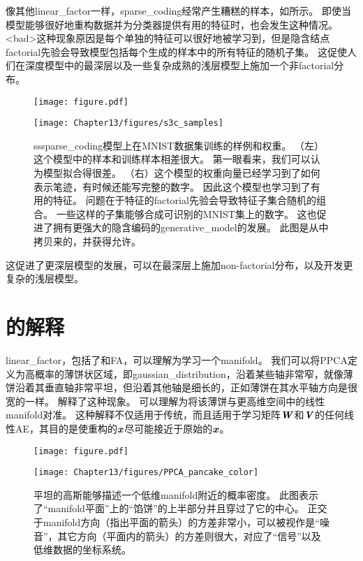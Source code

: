 像其他\gls{linear_factor}一样，\gls{sparse_coding}经常产生糟糕的样本，如所示。
即使当模型能够很好地重构数据并为分类器提供有用的特征时，也会发生这种情况。
<bad>这种现象原因是每个单独的特征可以很好地被学习到，但是隐含结点\gls{factorial}先验会导致模型包括每个生成的样本中的所有特征的随机子集。
这促使人们在深度模型中的最深层以及一些复杂成熟的浅层模型上施加一个非\gls{factorial}分布。

\begin{figure}[!htb]
\ifOpenSource
\centerline{\texttt{[image: figure.pdf]}}
\else
    \centerline{\texttt{[image: Chapter13/figures/s3c\_samples]}}
\fi
\caption{\gls{ss}\gls{sparse_coding}模型上在MNIST数据集训练的样例和权重。
	（左）这个模型中的样本和训练样本相差很大。
	第一眼看来，我们可以认为模型拟合得很差。
	（右）这个模型的权重向量已经学习到了如何表示笔迹，有时候还能写完整的数字。
	因此这个模型也学习到了有用的特征。
	问题在于特征的\gls{factorial}先验会导致特征子集合随机的组合。
	一些这样的子集能够合成可识别的MNIST集上的数字。
	这也促进了拥有更强大的隐含编码的\gls{generative_model}的发展。
	此图是从\citet{Goodfeli-et-al-TPAMI-Deep-PrePrint-2013-small}中拷贝来的，并获得允许。}
	\label{fig:s3c_samples}
\end{figure}

这促进了更深层模型的发展，可以在最深层上施加non-factorial分布，以及开发更复杂的浅层模型。


\section{的解释}
\label{sec:manifold_interpretation_of_pca}


\gls{linear_factor}，包括了和\gls{FA}，可以理解为学习一个\gls{manifold}\citep{hinton97modelling}。
我们可以将\gls{PPCA}定义为高概率的薄饼状区域，即\gls{gaussian_distribution}，沿着某些轴非常窄，就像薄饼沿着其垂直轴非常平坦，但沿着其他轴是细长的，正如薄饼在其水平轴方向是很宽的一样。
解释了这种现象。
可以理解为将该薄饼与更高维空间中的线性\gls{manifold}对准。
这种解释不仅适用于传统，而且适用于学习矩阵$\boldsymbol{\mathit{W}}$和$\boldsymbol{\mathit{V}}$的任何线性\gls{AE}，其目的是使重构的$\boldsymbol{\mathit{x}}$尽可能接近于原始的$\boldsymbol{\mathit{x}}$。

\begin{figure}[!htb]
\ifOpenSource
\centerline{\texttt{[image: figure.pdf]}}
\else
	\centerline{\texttt{[image: Chapter13/figures/PPCA\_pancake\_color]}}
\fi
	\caption{平坦的高斯能够描述一个低维\gls{manifold}附近的概率密度。
		此图表示了``\gls{manifold}平面''上的``馅饼''的上半部分并且穿过了它的中心。
		正交于\gls{manifold}方向（指出平面的箭头）的方差非常小，可以被视作是``噪音''，其它方向（平面内的箭头）的方差则很大，对应了``信号''以及低维数据的坐标系统。}
    \label{fig:PPCA_pancake}
\end{figure}


